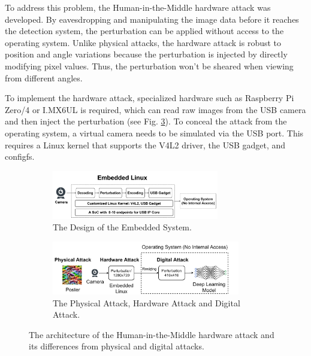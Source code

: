 
To address this problem, the Human-in-the-Middle  hardware attack was developed. By eavesdropping and manipulating the image data before it reaches the detection system, the perturbation can be applied without access to the operating system.  Unlike physical attacks, the hardware attack is robust to position and angle variations because the perturbation is injected by directly modifying pixel values. Thus, the perturbation won't be sheared when viewing from different angles.

To implement the hardware attack, specialized hardware such as Raspberry Pi Zero/4 or I.MX6UL is required, which can read raw images from the USB camera and then inject the perturbation (see Fig. \ref{fig:hardware}). To conceal the attack from the operating system, a virtual camera needs to be simulated via the USB port. This requires a Linux kernel that supports the V4L2 driver, the USB gadget, and configfs.

\begin{figure}[H]
    \centering
    \begin{subfigure}[b]{\textwidth}
    \centering
        \includegraphics[width=0.8\textwidth]{figures/chapter_detection/hardware/design.jpg}
        \caption{The Design of the Embedded System.}
        \label{fig:design}
    \end{subfigure}
    \begin{subfigure}[b]{\textwidth}
        \centering
        \includegraphics[width=0.9\textwidth]{figures/chapter_detection/hardware/minm_attack.jpg}
        \caption{The Physical Attack, Hardware Attack and Digital Attack.}
        \label{fig:comparison} 
    \end{subfigure}
  \caption{The architecture of the Human-in-the-Middle  hardware attack and its differences from physical and digital attacks.}
  \label{fig:hardware}
\end{figure}

